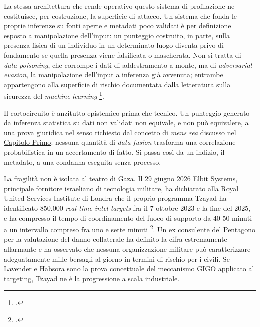 \documentclass[a4paper,12pt]{report}
\begin{document}
La stessa architettura che rende operativo questo sistema di profilazione ne
costituisce, per costruzione, la superficie di attacco. Un sistema che fonda le
proprie inferenze su fonti aperte e metadati poco validati è per definizione
esposto a manipolazione dell'input: un punteggio costruito, in parte, sulla
presenza fisica di un individuo in un determinato luogo diventa privo di
fondamento se quella presenza viene falsificata o mascherata. Non si tratta di
\textit{data poisoning}, che corrompe i dati di addestramento a monte, ma di
\textit{adversarial evasion}, la manipolazione dell'input a inferenza già
avvenuta; entrambe appartengono alla superficie di rischio documentata dalla
letteratura sulla sicurezza del \textit{machine learning}
\footcite{cina_2023_poisoning}.

Il cortocircuito è anzitutto epistemico prima che tecnico. Un punteggio generato
da inferenza statistica su dati non validati non equivale, e non può equivalere,
a una prova giuridica nel senso richiesto dal concetto di \textit{mens rea}
discusso nel \hyperref[cap1]{Capitolo Primo}: nessuna quantità di \textit{data fusion}
trasforma una correlazione probabilistica in un accertamento di fatto. Si passa
così da un indizio, il metadato, a una condanna eseguita senza processo.

La fragilità non è isolata al teatro di Gaza. Il 29 giugno 2026 Elbit Systems,
principale fornitore israeliano di tecnologia militare, ha dichiarato alla Royal
United Services Institute di Londra che il proprio programma Tzayad ha
identificato $850.000$ \textit{real-time intel targets} fra il 7 ottobre 2023 e
la fine del 2025, e ha compresso il tempo di coordinamento del fuoco di supporto
da 40-50 minuti a un intervallo compreso fra uno e sette minuti
\footcite{guardian_2026_tzayad}. Un ex consulente del Pentagono per la valutazione
del danno collaterale ha definito la cifra estremamente allarmante e ha osservato
che nessuna organizzazione militare può caratterizzare adeguatamente mille
bersagli al giorno in termini di rischio per i civili. Se Lavender e Habsora sono
la prova concettuale del meccanismo GIGO applicato al targeting, Tzayad ne è la
progressione a scala industriale.
\end{document}
